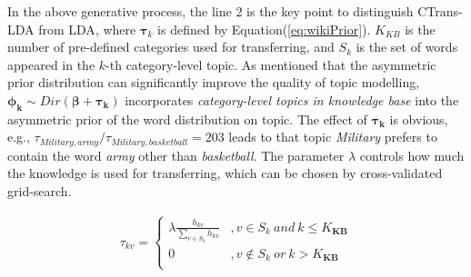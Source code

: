 \documentclass[runningheads,a4paper]{llncs}
\theoremstyle{exampstyle}
\begin{document}
In the above generative process, the line 2 is the key point to distinguish CTrans-LDA from LDA\cite{blei2003latent}, where \(\bm{\tau}_k\) is defined by Equation(\ref{eq:wikiPrior}).
\(K_{KB}\) is the number of pre-defined categories used for transferring, and \(S_k\) is the set of words appeared in the \(k\)-th category-level topic.
As \cite{wallach2008structured} mentioned that the asymmetric prior distribution can significantly improve the quality of topic modelling, \(\bm{\phi_k} \sim Dir(\bm{\beta}+ \bm{\tau_k})\) incorporates \textit{category-level topics in knowledge base} into the asymmetric prior of the word distribution on topic. 
The effect of \(\bm{\tau_k}\) is obvious, e.g., \(\tau_{Military,army}/\tau_{Military,basketball}=203\) leads to that topic \textit{Military} prefers to contain the word \textit{army} other than \textit{basketball}.
The parameter \(\lambda\) controls how much the knowledge is used for transferring, which can be chosen by cross-validated grid-search. 

\setlength{\abovedisplayskip}{0pt}
\setlength{\belowdisplayskip}{0pt}
\begin{scriptsize}
\begin{equation}
\label{eq:wikiPrior}
\begin{aligned}
\tau_{kv}=
\left\{ \begin{aligned}
\lambda \frac{h_{kv}}{\sum_{v\in S_{k}}h_{kv}} &,v\in S_{k}\ and  \ k \leq K_{\bm{KB}} \\
0&,v \notin S_{k} \ or \ k > K_{\bm{KB}} \\
\end{aligned}\right.
\end{aligned}
\end{equation}
\end{scriptsize}
\end{document}
